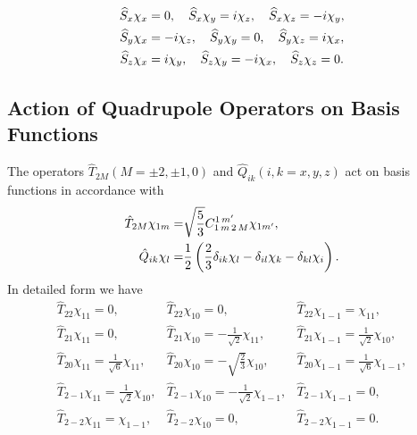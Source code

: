 \begin{gather}
    \widehat{S}_{x} \chi_{x}=0, \quad \widehat{S}_{x} \chi_{y}=i \chi_{z}, \quad \widehat{S}_{x} \chi_{z}=-i \chi_{y}, \notag\\
\widehat{S}_{y} \chi_{x}=-i \chi_{z}, \quad \widehat{S}_{y} \chi_{y}=0, \quad \widehat{S}_{y} \chi_{z}=i \chi_{x}, \label{eq:6:3:28}\\
\widehat{S}_{z} \chi_{x}=i \chi_{y}, \quad \widehat{S}_{z} \chi_{y}=-i \chi_{x}, \quad \widehat{S}_{z} \chi_{z}=0 . \notag
\end{gather}
\subsection{Action of Quadrupole Operators on Basis Functions}\label{sec:6.3.4}
The operators $\widehat{T}_{2 M}(M= \pm 2, \pm 1,0)$ and $\widehat{Q}_{i k}(i, k=x, y, z)$ act on basis functions in accordance with
\begin{align}
\hat{T}_{2 M} \chi_{1 m}=&\sqrt{\frac{5}{3}} C_{1\,m\,2\,M}^{1\,m^{\prime}} \chi_{1 m^{\prime}}, \label{eq:6:3:29}\\
\hat{Q}_{i k} \chi_{l}=&\frac{1}{2}\left(\frac{2}{3} \delta_{i k} \chi_{l}-\delta_{i l} \chi_{k}-\delta_{k l} \chi_{i}\right) . \notag
\end{align}
In detailed form we have
\begin{equation}
\begin{array}{lll}
\hat{T}_{22} \chi_{11}=0, & \hat{T}_{22} \chi_{10}=0, & \hat{T}_{22} \chi_{1-1}=\chi_{11}, \\
\hat{T}_{21} \chi_{11}=0, & \hat{T}_{21} \chi_{10}=-\frac{1}{\sqrt{2}} \chi_{11}, & \hat{T}_{21} \chi_{1-1}=\frac{1}{\sqrt{2}} \chi_{10}, \\
\hat{T}_{20} \chi_{11}=\frac{1}{\sqrt{6}} \chi_{11}, & \hat{T}_{20} \chi_{10}=-\sqrt{\frac{2}{3}} \chi_{10}, & \hat{T}_{20} \chi_{1-1}=\frac{1}{\sqrt{6}} \chi_{1-1}, \label{eq:6:3:30}\\
\hat{T}_{2-1} \chi_{11}=\frac{1}{\sqrt{2}} \chi_{10}, & \hat{T}_{2-1} \chi_{10}=-\frac{1}{\sqrt{2}} \chi_{1-1}, & \hat{T}_{2-1} \chi_{1-1}=0, \\
\hat{T}_{2-2} \chi_{11}=\chi_{1-1}, & \hat{T}_{2-2} \chi_{10}=0, & \hat{T}_{2-2} \chi_{1-1}=0 .
\end{array}
\end{equation}
